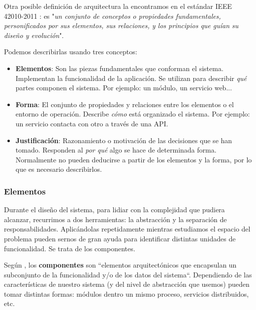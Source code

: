 Otra posible definición de arquitectura la encontramos en el estándar IEEE 42010-2011 \cite{ieeeStandard420102011Systems2011}: es "\emph{un conjunto de conceptos o propiedades fundamentales, personificados por sus elementos, sus relaciones, y los principios que guían su diseño y evolución}".

Podemos describirlas usando tres conceptos: \cite{perryFoundationsStudySoftware1992}

    \begin{itemize}
        \item \textbf{Elementos}: Son las piezas fundamentales que conforman el sistema. Implementan la funcionalidad de la aplicación. Se utilizan para describir \emph{qué} partes componen el sistema. Por ejemplo: un módulo, un servicio web...

        \item \textbf{Forma}: El conjunto de propiedades y relaciones entre los elementos o el entorno de operación. Describe \emph{cómo} está organizado el sistema. Por ejemplo: un servicio contacta con otro a través de una API.

        \item \textbf{Justificación}: Razonamiento o motivación de las decisiones que se han tomado. Responden al \emph{por qué} algo se hace de determinada forma. Normalmente no pueden deducirse a partir de los elementos y la forma, por lo que es necesario describirlos.

    \end{itemize}

\pagebreak

\subsubsection{Elementos}

Durante el diseño del sistema, para lidiar con la complejidad que pudiera alcanzar, recurrimos a dos herramientas: la abstracción y la separación de responsabilidades. \cite{martinCleanArchitectureCraftsman2018} Aplicándolas repetidamente mientras estudiamos el espacio del problema pueden sernos de gran ayuda para identificar distintas unidades de funcionalidad. Se trata de los componentes.

Según \cite{taylorSoftwareArchitectureFoundations2009}, los \textbf{componentes} son ``elementos arquitectónicos que encapsulan un subconjunto de la funcionalidad y/o de los datos del sistema``.
Dependiendo de las características de nuestro sistema (y del nivel de abstracción que usemos) pueden tomar distintas formas: módulos dentro un mismo proceso, servicios distribuidos, etc.

